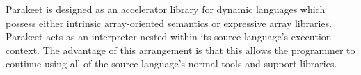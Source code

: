 \documentclass[preprint]{sigplanconf}
\begin{document}



Parakeet is designed as an accelerator library for dynamic languages which possess either intrinsic array-oriented semantics or expressive array libraries. Parakeet acts as an interpreter nested within its source language's execution context. The advantage of this arrangement is that this allows the programmer to continue using all of the source language's normal tools and support libraries.
\end{document}

